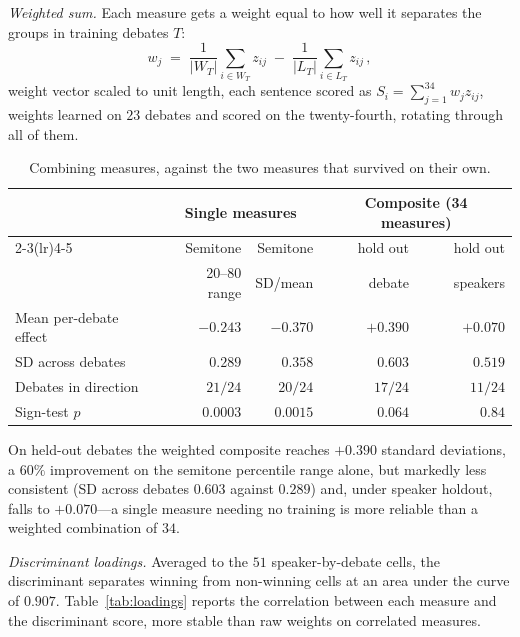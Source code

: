 \documentclass[journal]{IEEEtran}
\begin{document}
\emph{Weighted sum.} Each measure gets a weight equal to how well it
separates the groups in training debates $T$:
\begin{equation}
w_j \;=\; \frac{1}{|W_T|}\sum_{i \in W_T} z_{ij} \;-\;
          \frac{1}{|L_T|}\sum_{i \in L_T} z_{ij} \,,
\label{eq:weights}
\end{equation}
weight vector scaled to unit length, each sentence scored as
$S_i = \sum_{j=1}^{34} w_j z_{ij}$, weights learned on $23$ debates and
scored on the twenty-fourth, rotating through all of them.

\begin{table}[h]
\caption{Combining measures, against the two measures that survived on their
own.}
\label{tab:combine}
\centering
\scriptsize
\setlength{\tabcolsep}{2.5pt}
\begin{tabular}{lrrrr}
\toprule
 & \multicolumn{2}{c}{Single measures} & \multicolumn{2}{c}{Composite (34 measures)} \\
\cmidrule(lr){2-3}\cmidrule(lr){4-5}
 & Semitone & Semitone & hold out & hold out \\
 & 20--80 range & SD/mean & debate & speakers \\
\midrule
Mean per-debate effect & $-0.243$ & $\mathbf{-0.370}$ & $+0.390$ & $+0.070$ \\
SD across debates      & $0.289$  & $0.358$  & $0.603$ & $0.519$ \\
Debates in direction   & $21/24$  & $20/24$  & $17/24$ & $11/24$ \\
Sign-test $p$          & $0.0003$ & $0.0015$ & $0.064$ & $0.84$ \\
\bottomrule
\end{tabular}
\end{table}

On held-out debates the weighted composite reaches $+0.390$ standard
deviations, a $60\%$ improvement on the semitone percentile range alone, but
markedly less consistent (SD across debates $0.603$ against $0.289$) and,
under speaker holdout, falls to $+0.070$---a single measure needing no
training is more reliable than a weighted combination of $34$.

\emph{Discriminant loadings.} Averaged to the $51$ speaker-by-debate cells,
the discriminant separates winning from non-winning cells at an area under
the curve of $0.907$. Table~\ref{tab:loadings} reports the correlation
between each measure and the discriminant score, more stable than raw
weights on correlated measures.
\end{document}
